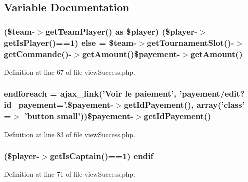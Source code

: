 \subsection{Variable Documentation}
\hypertarget{backend_2modules_2team_2templates_2view_success_8php_a77770acd5e565312bd73892fa48fe037}{
\subsubsection[{else}]{ (\$team-\/$>$get\-Team\-Player() as \$player) (\$player-\/$>$get\-Is\-Player()==1) else = \$team-\/$>$get\-Tournament\-Slot()-\/$>$get\-Commande()-\/$>$get\-Amount()\$payement-\/$>$get\-Amount()}}\label{backend_2modules_2team_2templates_2view_success_8php_a77770acd5e565312bd73892fa48fe037}


Definition at line 67 of file view\-Success.\-php.

\hypertarget{backend_2modules_2team_2templates_2view_success_8php_a672d9707ef91db026c210f98cc601123}{
\subsubsection[{endforeach}]{\setlength{\rightskip}{0pt plus 5cm}endforeach = ajax\-\_\-link('Voir le paiement', 'payement/edit?id\-\_\-payement='.\$payement-\/$>$get\-Id\-Payement(), array('{\bf class}' =$>$ 'button small'))\$payement-\/$>$get\-Id\-Payement()}}\label{backend_2modules_2team_2templates_2view_success_8php_a672d9707ef91db026c210f98cc601123}


Definition at line 83 of file view\-Success.\-php.

\hypertarget{backend_2modules_2team_2templates_2view_success_8php_a6d7c1eb108058e946fe57a74fd262298}{
\subsubsection[{endif}]{ (\$player-\/$>$get\-Is\-Captain()==1) endif}}\label{backend_2modules_2team_2templates_2view_success_8php_a6d7c1eb108058e946fe57a74fd262298}


Definition at line 71 of file view\-Success.\-php.

